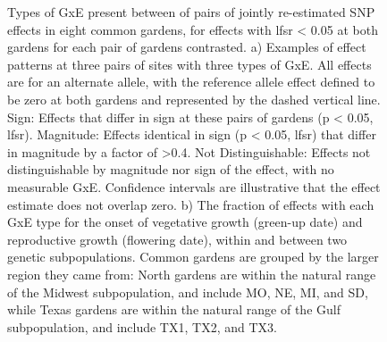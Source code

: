 \documentclass[
  9pt,
  twocolumn,
  twoside]{simple-article}%
\begin{document}
\begin{figure}


\caption{\label{fig-effects}Types of GxE present between of pairs of
jointly re-estimated SNP effects in eight common gardens, for effects
with lfsr \textless{} 0.05 at both gardens for each pair of gardens
contrasted. a) Examples of effect patterns at three pairs of sites with
three types of GxE. All effects are for an alternate allele, with the
reference allele effect defined to be zero at both gardens and
represented by the dashed vertical line. Sign: Effects that differ in
sign at these pairs of gardens (p \textless{} 0.05, lfsr). Magnitude:
Effects identical in sign (p \textless{} 0.05, lfsr) that differ in
magnitude by a factor of \textgreater0.4. Not Distinguishable: Effects
not distinguishable by magnitude nor sign of the effect, with no
measurable GxE. Confidence intervals are illustrative that the effect
estimate does not overlap zero. b) The fraction of effects with each GxE
type for the onset of vegetative growth (green-up date) and reproductive
growth (flowering date), within and between two genetic subpopulations.
Common gardens are grouped by the larger region they came from: North
gardens are within the natural range of the Midwest subpopulation, and
include MO, NE, MI, and SD, while Texas gardens are within the natural
range of the Gulf subpopulation, and include TX1, TX2, and TX3.}

\end{figure}%
\end{document}
